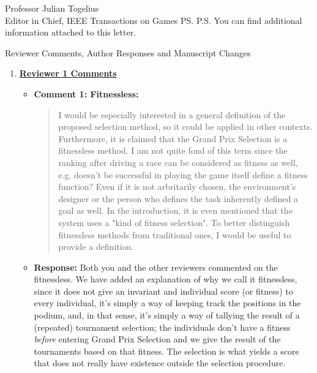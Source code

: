 \documentclass[10pt]{letter} %
\begin{document}
\begin{letter}{Professor Julian Togelius \\ Editor in Chief, IEEE Transactions on Games}
\ps{P.S. You can find additional information attached to this letter.} %







\newpage

Reviewer Comments, Author Responses and Manuscript Changes
\begin{enumerate}


\item {\bf \underline{ Reviewer 1 Comments}}\\
	\begin{itemize}
		\item {\bf Comment 1: Fitnessless:
		\begin{quote}
			I would be especially interested in a general definition of the
			proposed selection method, so it could be applied in other
			contexts. Furthermore, it is claimed that the Grand Prix Selection is
			a fitnessless method. I am not quite fond of this term since the
			ranking after driving a race can be considered as fitness as well,
			e.g. doesn't be successful in playing the game itself define a fitness
			function? Even if it is not arbritarily chosen, the environment's
			designer or the person who defines the task inherently defined a goal
			as well. In the introduction, it is even mentioned that the system
			uses a "kind of fitness selection". To better distinguish fitnessless
			methods from traditional ones, I would be useful to provide a
			definition.
		\end{quote}
	}
		\item {\bf Response:} 
		Both you and the other reviewers commented on the fitnessless. 
		We have added an explanation of why we call it fitnessless, since it
		does not give an invariant and individual score (or fitness) to every
		individual, it's simply a way of keeping track the positions in the
		podium, and, in that sense, it's simply a way of tallying the result
		of a (repeated) tournament selection; the individuals don't have a
		fitness {\em before} entering Grand Prix Selection and we give the
		result of the tournaments based on that fitness. The selection is what
		yields a score that does not really have existence outside the
		selection procedure.
		

\end{itemize}
\end{enumerate}
\end{letter}
\end{document}
